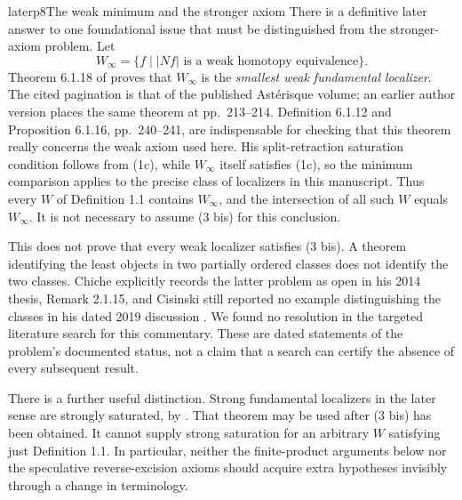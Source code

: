 \begin{dcomment}{later}{p8}{The weak minimum and the stronger axiom}
There is a definitive later answer to one foundational issue that must be distinguished from the stronger-axiom problem. Let
\[
W_\infty=\{f\mid |Nf|\text{ is a weak homotopy equivalence}\}.
\]
Theorem 6.1.18 of \citet[pp.~242--243]{Cisinski2006} proves that $W_\infty$ is the \emph{smallest weak fundamental localizer}. The cited pagination is that of the published Ast\'erisque volume; an earlier author version places the same theorem at pp.~213--214. Definition 6.1.12 and Proposition 6.1.16, pp.~240--241, are indispensable for checking that this theorem really concerns the weak axiom used here. His split-retraction saturation condition follows from (1c), while $W_\infty$ itself satisfies (1c), so the minimum comparison applies to the precise class of localizers in this manuscript. Thus every $W$ of Definition 1.1 contains $W_\infty$, and the intersection of all such $W$ equals $W_\infty$. It is not necessary to assume (3 bis) for this conclusion.

This does not prove that every weak localizer satisfies (3 bis). A theorem identifying the least objects in two partially ordered classes does not identify the two classes. Chiche explicitly records the latter problem as open in his 2014 thesis, Remark 2.1.15, and Cisinski still reported no example distinguishing the classes in his dated 2019 discussion \citep{Chiche2014,Cisinski2019WeakLocalizers}. We found no resolution in the targeted literature search for this commentary. These are dated statements of the problem's documented status, not a claim that a search can certify the absence of every subsequent result.

There is a further useful distinction. Strong fundamental localizers in the later sense are strongly saturated, by \citet[Proposition 4.2.4]{Cisinski2006}. That theorem may be used after (3 bis) has been obtained. It cannot supply strong saturation for an arbitrary $W$ satisfying just Definition 1.1. In particular, neither the finite-product arguments below nor the speculative reverse-excision axioms should acquire extra hypotheses invisibly through a change in terminology.
\end{dcomment}

